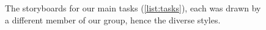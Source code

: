 \documentclass[a4paper, 11pt]{report}
\begin{document}
\begin{figure}[!h]
{		\label{subfig:c}%
	}\hfill
	\caption{The storyboards for our main tasks (\cref{list:tasks}), each was drawn by a different member of
		our group, hence the diverse styles.}\label{fig:fig}
\end{figure}
\end{document}
